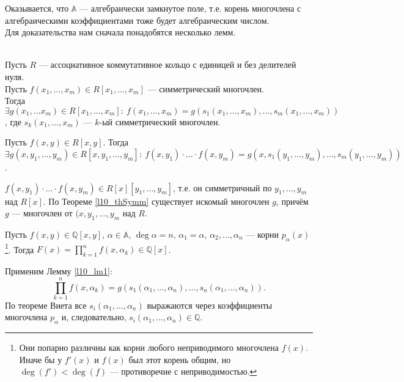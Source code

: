 Оказывается, что $\mathbb{A}$ — алгебраически замкнутое поле, т.е. корень многочлена с алгебраическими коэффициентами тоже будет алгебраическим числом.\\
Для доказательства нам сначала понадобятся несколько лемм.

\begin{theorem} \label{l10_thSymm}~\\
	Пусть $R$ — ассоциативное коммутативное кольцо с единицей и без делителей нуля.\\
	Пусть $f \left( x_1, \dots, x_m \right) \in R \left[ x_1, \dots, x_m \right]$ — симметрический многочлен.\\
	Тогда $\exists g\left( x_1, \dots x_m \right) \in R \left[ x_1, \dots, x_m \right]: \ f\left( x_1, \dots, x_m \right) = g\left( s_1\left( x_1, \dots, x_m \right), \dots, s_m\left( x_1, \dots, x_m \right) \right)$, где $s_k\left( x_1, \dots, x_m \right)$ — $k$-ый симметрический многочлен.
\end{theorem}

\begin{lemma} \label{l10_lm1}
	Пусть $f(x,y) \in R[x,y]$. Тогда
	$\displaystyle \exists g(x, y_1, \dots, y_m) \in R[x, y_1, \dots, y_m]: \ f(x,y_1)\cdot...\cdot f(x,y_m) = g(x,s_1(y_1,\dots,y_m),\dots,s_m(y_1,\dots,y_m))$.
\end{lemma}
\begin{pf}
	$f(x,y_1) \cdot ... \cdot f(x, y_m) \in R[x][y_1,\dots,y_m]$, т.е. он симметричный по $y_1,\dots,y_m$ над $R[x]$. По Теореме \ref{l10_thSymm} существует искомый многочлен $g$, причём $g$ — многочлен от $(x,y_1,\dots,y_m$ над $R$.
\end{pf}

\begin{lemma} \label{l10_lm2}
	Пусть $f(x,y) \in \mathbb{Q}[x,y], \, \alpha \in \mathbb{A}, \, \deg\alpha = n, \, \alpha_1 = \alpha, \, \alpha_2,\dots,\alpha_n$ — корни $p_\alpha(x)$\footnote{Они попарно различны как корни любого неприводимого многочлена $f(x)$. Иначе бы у $f'(x)$ и $f(x)$ был этот корень общим, но $\deg(f') < \deg(f)$ — противоречие с неприводимостью.}. Тогда $F(x) = \prod\limits_{k=1}^n f(x,\alpha_k) \in \mathbb{Q}[x]$.
\end{lemma}
\begin{pf}
	Применим Лемму \ref{l10_lm1}:
	$$\prod\limits_{k=1}^n f(x, \alpha_k) = g\left( s_1\left( \alpha_1, \dots, \alpha_n \right), \dots, s_n\left( \alpha_1, \dots, \alpha_n \right) \right).$$
	По теореме Виета все $s_i(\alpha_1,\dots,\alpha_n)$ выражаются через коэффициенты многочлена $p_\alpha$ и, следовательно, $s_i(\alpha_1,\dots,\alpha_n) \in \mathbb{Q}$.
\end{pf}

